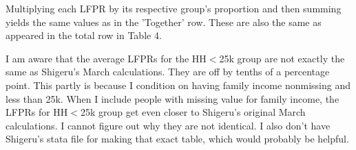 \documentclass{article}
\begin{document}
Multiplying each LFPR by its respective group's proportion and then summing yields the same values as in the 'Together' row. These are also the same as appeared in the total row in Table 4. 


I am aware that the average LFPRs for the HH$<$25k group are not exactly the same as Shigeru's March calculations. They are off by tenths of a percentage point. This partly is because I condition on having family income nonmissing and less than 25k. When I include people with missing value for family income, the LFPRs for HH$<$25k group get even closer to Shigeru's original March calculations. I cannot figure out why they are not identical. I also don't have Shigeru's stata file for making that exact table, which would probably be helpful.
\end{document}
